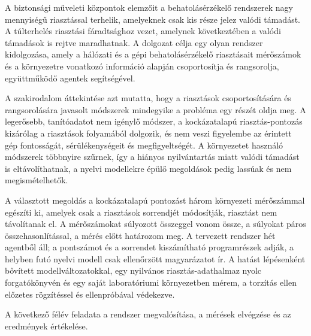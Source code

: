 A biztonsági műveleti központok elemzőit a behatolásérzékelő rendszerek nagy mennyiségű riasztással terhelik, amelyeknek csak kis része jelez valódi támadást. A túlterhelés riasztási fáradtsághoz vezet, amelynek következtében a valódi támadások is rejtve maradhatnak. A dolgozat célja egy olyan rendszer kidolgozása, amely a hálózati és a gépi behatolásérzékelő riasztásait mérőszámok és a környezetre vonatkozó információ alapján csoportosítja és rangsorolja, együttműködő agentek segítségével.

A szakirodalom áttekintése azt mutatta, hogy a riasztások csoportosítására és rangsorolására javasolt módszerek mindegyike a probléma egy részét oldja meg. A legerősebb, tanítóadatot nem igénylő módszer, a kockázatalapú riasztás-pontozás kizárólag a riasztások folyamából dolgozik, és nem veszi figyelembe az érintett gép fontosságát, sérülékenységeit és megfigyeltségét. A környezetet használó módszerek többnyire szűrnek, így a hiányos nyilvántartás miatt valódi támadást is eltávolíthatnak, a nyelvi modellekre épülő megoldások pedig lassúak és nem megismételhetők.

A választott megoldás a kockázatalapú pontozást három környezeti mérőszámmal egészíti ki, amelyek csak a riasztások sorrendjét módosítják, riasztást nem távolítanak el. A mérőszámokat súlyozott összeggel vonom össze, a súlyokat páros összehasonlítással, a mérés előtt határozom meg. A tervezett rendszer hét agentből áll; a pontszámot és a sorrendet kiszámítható programrészek adják, a helyben futó nyelvi modell csak ellenőrzött magyarázatot ír. A hatást lépésenként bővített modellváltozatokkal, egy nyilvános riasztás-adathalmaz nyolc forgatókönyvén és egy saját laboratóriumi környezetben mérem, a torzítás ellen előzetes rögzítéssel és ellenpróbával védekezve.

A következő félév feladata a rendszer megvalósítása, a mérések elvégzése és az eredmények értékelése.
